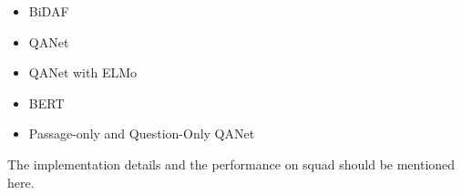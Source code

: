 \begin{itemize}
    \item BiDAF
    \item QANet 
    \item QANet with ELMo
    \item BERT
    \item Passage-only and Question-Only QANet
\end{itemize}

The implementation details and the performance on squad should be mentioned here.